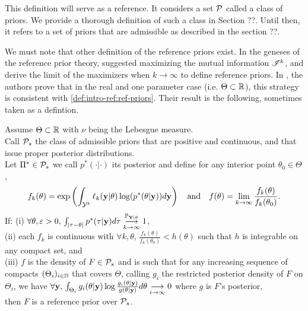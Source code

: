 This definition will serve as a reference. It considers a set $\cP$ called a class of priors. 
We provide a thorough definition of such a class in Section ??.
Until then, it refers to a set of priors that are admissible as described in the section ??.


We must note that other definition of the reference priors exist.
In the geneses of the reference prior theory, \citet{bernardo_reference_1979} suggested maximizing the mutual information $\sI^k$, and derive the limit of the maximizers when $k\to\infty$ to define reference priors.
In \cite{berger_formal_2009}, the authors prove that in the real and one parameter case (i.e. $\Theta\subset\RR$), this strategy is consistent with \cref{def:intro-ref:ref-priors}. Their result is the following, sometimes taken as a defintion.

\begin{thm}\label{thm:intro-ref:explicitRP}
    Assume $\Theta\subset\RR$ with $\nu$ being the Lebesgue measure.\\
    Call $\cP_s$ the class of admissible priors that are positive and continuous, and that issue proper posterior distributions.\\
    Let $\Pi^\ast\in\cP_s$ we call $p^\ast(\cdot|\cdot)$ its posterior and define for any interior point $\theta_0\in\Theta$,
        \begin{equation}
                f_k(\theta) = \exp\left(\int_{\cY^k}\ell_k(\mbf y|\theta)\log(p^\ast(\theta|\mbf y)) d\mbf y \right) \quad\text{and}\quad  %
                f(\theta) = \lim_{k\rightarrow\infty}\frac{f_k(\theta)}{f_k(\theta_0)}.
        \end{equation}
    If: (i) $ \forall \theta,\eps>0,\,\int_{|\tau-\theta|} p^\ast(\tau|\mbf y)d\tau \conv[\PP_{\mbf Y|\theta}]{k\rightarrow\infty}1$,\\ (ii) each $f_k$ is continuous with $\forall k,\theta,\, \frac{f_k(\theta)}{f_k(\theta_0)} <h(\theta)$ such that $h$ is integrable on any compact set, and\\
    (iii) $f$ is the density of $F\in\cP_s$  and is such that for any increasing sequence of compacts $(\Theta_i)_{i\in\NN}$ that covers $\Theta$, calling $g_i$ the restricted posterior density of $F$ on $\Theta_i$, we have $\forall \mbf y,\, \int_{\Theta_i}g_i(\theta|\mbf y)\log\frac{g_i(\theta|\mbf y)}{g(\theta|\mbf y)}d\theta \conv{i\rightarrow\infty}0$ where $g$ is $F$'s posterior,\\
    then $F$ is a reference prior over $\cP_s$.
 \end{thm}


